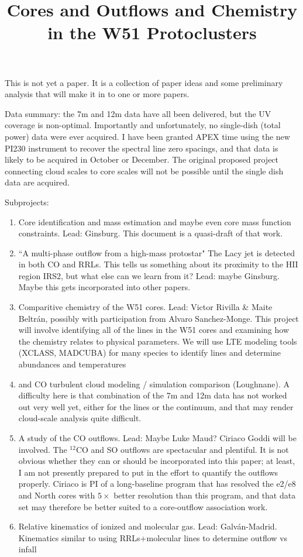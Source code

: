 \documentclass{aa}
\begin{document}
\title{Cores and Outflows and Chemistry in the W51 Protoclusters}

This is not yet a paper.  It is a collection of paper ideas and some 
preliminary analysis that will make it in to one or more papers.

Data summary: the 7m and 12m data have all been delivered, but the UV coverage
is non-optimal.  Importantly and unfortunately, no single-dish (total power)
data were ever acquired.  I have been granted APEX time using the new
PI230 instrument to recover the spectral line zero spacings, and that data is likely
to be acquired in October or December.  The original proposed project connecting
cloud scales to core scales will not be possible until the single dish data are
acquired.


Subprojects:
\begin{enumerate}
    \item Core identification and mass estimation and maybe even
        core mass function constraints.  Lead: Ginsburg.  This document
        is a quasi-draft of that work.
    \item ``A multi-phase outflow from a high-mass protostar"
        The Lacy jet is detected in both CO and RRLs.  This tells us something
        about its proximity to the HII region IRS2, but what else can we learn
        from it?  Lead: maybe Ginsburg.  Maybe this gets incorporated
        into other papers.
    \item Comparitive chemistry of the W51 cores.  Lead: Victor Rivilla \&
        Maite Beltr{\'a}n, possibly with participation from Alvaro
        Sanchez-Monge.
        This project will involve identifying all of the lines in the W51 cores
        and examining how the chemistry relates to physical parameters.
        We will use LTE modeling tools (XCLASS, MADCUBA) for many species to
        identify lines and determine abundances and temperatures
    \item \formaldehyde and CO turbulent cloud modeling / simulation comparison
        (Loughnane).  A difficulty here is that combination of the 7m and 12m
        data has not worked out very well yet, either for the lines or the
        continuum, and that may render cloud-scale analysis quite difficult.
    \item A study of the CO outflows.  Lead: Maybe Luke Maud?  Ciriaco Goddi
        will be involved.  The $^{12}$CO and SO outflows are spectacular and
        plentiful.  It is not obvious whether they can or should be
        incorporated into this paper; at least, I am not presently prepared to
        put in the effort to quantify the outflows properly.  Ciriaco is PI of
        a long-baseline program that has resolved the e2/e8 and North cores
        with $5\times$ better resolution than this program, and that data set
        may therefore be better suited to a core-outflow association work.
    \item Relative kinematics of ionized and molecular gas.  Lead: Galv{\'a}n-Madrid.
        Kinematics similar to \citet{Keto2008a} using RRLs+molecular lines to determine
        outflow vs infall
        
\end{enumerate}
\end{document}
